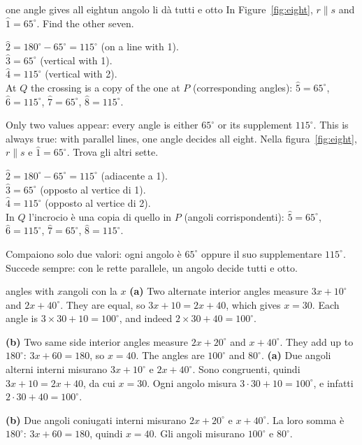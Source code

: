 \documentclass[10pt,a4paper,oneside]{book}
\newcommand{\av}[1]{\widehat{#1}}           %
\begin{document}
\begin{example}{one angle gives all eight}{un angolo li dà tutti e otto}
In Figure~\ref{fig:eight}, $r \parallel s$ and $\av{1} = 65^\circ$. Find the other seven.

$\av{2} = 180^\circ - 65^\circ = 115^\circ$ (on a line with 1).\\
$\av{3} = 65^\circ$ (vertical with 1).\\
$\av{4} = 115^\circ$ (vertical with 2).\\
At $Q$ the crossing is a copy of the one at $P$ (corresponding angles): $\av{5} = 65^\circ$, $\av{6} = 115^\circ$, $\av{7} = 65^\circ$, $\av{8} = 115^\circ$.

Only two values appear: every angle is either $65^\circ$ or its supplement $115^\circ$. This is always true: with parallel lines, one angle decides all eight.
\tcblower
Nella figura~\ref{fig:eight}, $r \parallel s$ e $\av{1} = 65^\circ$. Trova gli altri sette.

$\av{2} = 180^\circ - 65^\circ = 115^\circ$ (adiacente a 1).\\
$\av{3} = 65^\circ$ (opposto al vertice di 1).\\
$\av{4} = 115^\circ$ (opposto al vertice di 2).\\
In $Q$ l'incrocio è una copia di quello in $P$ (angoli corrispondenti): $\av{5} = 65^\circ$, $\av{6} = 115^\circ$, $\av{7} = 65^\circ$, $\av{8} = 115^\circ$.

Compaiono solo due valori: ogni angolo è $65^\circ$ oppure il suo supplementare $115^\circ$. Succede sempre: con le rette parallele, un angolo decide tutti e otto.
\end{example}

\begin{example}{angles with $x$}{angoli con la $x$}
\textbf{(a)} Two alternate interior angles measure $3x + 10^\circ$ and $2x + 40^\circ$. They are equal, so $3x + 10 = 2x + 40$, which gives $x = 30$. Each angle is $3 \times 30 + 10 = 100^\circ$, and indeed $2 \times 30 + 40 = 100^\circ$.

\textbf{(b)} Two same side interior angles measure $2x + 20^\circ$ and $x + 40^\circ$. They add up to $180^\circ$: $3x + 60 = 180$, so $x = 40$. The angles are $100^\circ$ and $80^\circ$.
\tcblower
\textbf{(a)} Due angoli alterni interni misurano $3x + 10^\circ$ e $2x + 40^\circ$. Sono congruenti, quindi $3x + 10 = 2x + 40$, da cui $x = 30$. Ogni angolo misura $3 \cdot 30 + 10 = 100^\circ$, e infatti $2 \cdot 30 + 40 = 100^\circ$.

\textbf{(b)} Due angoli coniugati interni misurano $2x + 20^\circ$ e $x + 40^\circ$. La loro somma è $180^\circ$: $3x + 60 = 180$, quindi $x = 40$. Gli angoli misurano $100^\circ$ e $80^\circ$.
\end{example}
\end{document}
